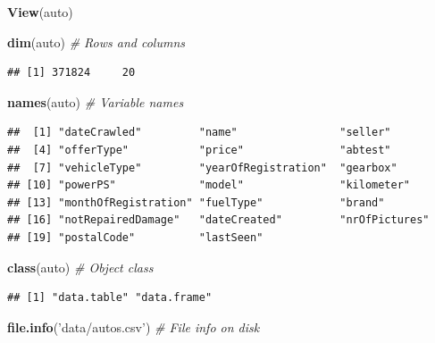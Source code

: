 \documentclass[]{book}
\newenvironment{Shaded}{\begin{snugshade}}{\end{snugshade}}
\newcommand{\CommentTok}[1]{\textcolor[rgb]{0.56,0.35,0.01}{\textit{#1}}}
\newcommand{\KeywordTok}[1]{\textcolor[rgb]{0.13,0.29,0.53}{\textbf{#1}}}
\newcommand{\NormalTok}[1]{#1}
\newcommand{\StringTok}[1]{\textcolor[rgb]{0.31,0.60,0.02}{#1}}
\theoremstyle{definition}
\theoremstyle{definition}
\theoremstyle{definition}
\theoremstyle{remark}
\begin{document}
\begin{Shaded}
\begin{Highlighting}[]
\KeywordTok{View}\NormalTok{(auto)}
\end{Highlighting}
\end{Shaded}

\begin{Shaded}
\begin{Highlighting}[]
\KeywordTok{dim}\NormalTok{(auto) }\CommentTok{#  Rows and columns}
\end{Highlighting}
\end{Shaded}

\begin{verbatim}
## [1] 371824     20
\end{verbatim}

\begin{Shaded}
\begin{Highlighting}[]
\KeywordTok{names}\NormalTok{(auto) }\CommentTok{# Variable names}
\end{Highlighting}
\end{Shaded}

\begin{verbatim}
##  [1] "dateCrawled"         "name"                "seller"             
##  [4] "offerType"           "price"               "abtest"             
##  [7] "vehicleType"         "yearOfRegistration"  "gearbox"            
## [10] "powerPS"             "model"               "kilometer"          
## [13] "monthOfRegistration" "fuelType"            "brand"              
## [16] "notRepairedDamage"   "dateCreated"         "nrOfPictures"       
## [19] "postalCode"          "lastSeen"
\end{verbatim}

\begin{Shaded}
\begin{Highlighting}[]
\KeywordTok{class}\NormalTok{(auto) }\CommentTok{# Object class}
\end{Highlighting}
\end{Shaded}

\begin{verbatim}
## [1] "data.table" "data.frame"
\end{verbatim}

\begin{Shaded}
\begin{Highlighting}[]
\KeywordTok{file.info}\NormalTok{(}\StringTok{'data/autos.csv'}\NormalTok{) }\CommentTok{# File info on disk}
\end{Highlighting}
\end{Shaded}
\end{document}
